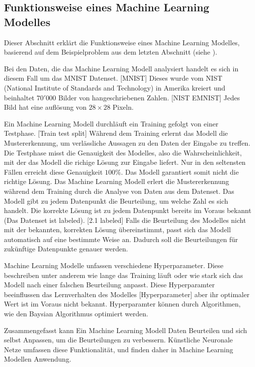 \subsection{Funktionsweise eines Machine Learning Modelles}
\label{sub:funktionsweise}
Dieser Abschnitt erklärt die Funktionsweise eines Machine Learning Modelles,
basierend auf dem Beispielproblem aus dem letzten Abschnitt (siehe
). 

Bei den Daten, die das Machine Learning Modell analysiert handelt es sich in
diesem Fall um das MNIST Datenset. [MNIST]  Dieses wurde vom NIST (National
Institute of Standards and Technology) in Amerika kreiert und beinhaltet
$70'000$ Bilder von hangeschriebenen Zahlen. [NIST EMNIST] Jedes Bild hat eine
auflösung von $28\times28$ Pixeln.
                

Ein Machine Learning Modell durchläuft ein Training gefolgt von einer Testphase.
[Train test split] Während dem Training erlernt das Modell die Mustererkennung,
um verlässliche Aussagen zu den Daten der Eingabe zu treffen. Die Testphase
misst die Genauigkeit des Modelles, also die Wahrscheinlichkeit, mit der das
Modell die richige Lösung zur Eingabe liefert. Nur in den seltensten Fällen
erreicht diese Genauigkeit $100\%$. Das Modell garantiert somit nicht die
richtige Lösung. Das Machine Learning Modell erlert die Mustererkennung während
dem Training durch die Analyse von Daten aus dem Datenset. Das Modell gibt zu
jedem Datenpunkt die Beurteilung, um welche Zahl es sich handelt. Die korrekte
Lösung ist zu jedem Datenpunkt bereits im Voraus bekannt (Das Datenset ist
labeled). [2.1 labeled] Falls die Beurteilung des Modelles nicht mit der
bekannten, korrekten Lösung übereinstimmt, passt sich das Modell automatisch auf
eine bestimmte Weise an. Dadurch soll die Beurteilungen für zukünftige
Datenpunkte genauer werden.

Machine Learning Modelle unfassen verschiedene Hyperparameter. Diese beschreiben
unter anderem wie lange das Training läuft oder wie stark sich das Modell nach
einer falschen Beurteilung anpasst. Diese Hyperparamter beeinflussen das
Lernverhalten des Modelles [Hyperparameter] aber ihr optimaler Wert ist im
Voraus nicht bekannt. Hyperparamter können durch Algorithmen, wie den Baysian
Algorithmus optimiert werden.

Zusammengefasst kann Ein Machine Learning Modell Daten Beurteilen und sich
selbst Anpassen, um die Beurteilungen zu verbessern. Künstliche Neuronale Netze
umfassen diese Funktionalität, und finden daher in Machine Learning Modellen
Anwendung.


